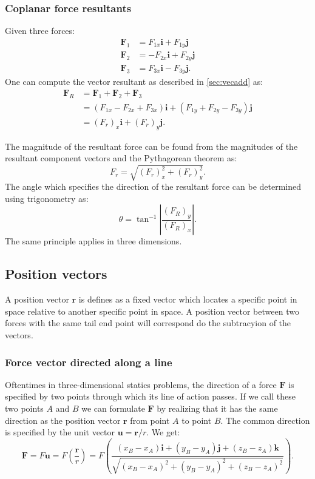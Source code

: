 \subsubsection{Coplanar force resultants}
Given three forces:
\begin{align*}
  \textbf{F}_1 &= F_{1x} \textbf{i} + F_{1y} \textbf{j} \\
  \textbf{F}_2 &= - F_{2x} \textbf{i} + F_{2y} \textbf{j} \\
  \textbf{F}_3 &= F_{3x} \textbf{i} - F_{3y} \textbf{j}
.\end{align*}
One can compute the vector resultant as described in \autoref{sec:vecadd} as:
\begin{align*}
  \textbf{F}_R &= \textbf{F}_1 + \textbf{F}_2 + \textbf{F}_3 \\
  &= \left( F_{1x} - F_{2x} + F_{3x} \right) \textbf{i} + \left( F_{1y} + F_{2y} - F_{3y} \right) \textbf{j} \\
  &= \left( F_r \right)_x \textbf{i} + \left( F_{r} \right)_y \textbf{j}
.\end{align*}

The magnitude of the resultant force can be found from the magnitudes of the resultant component vectors and the Pythagorean theorem as:
\[ 
F_r = \sqrt{\left( F_r \right)^2_{x} + \left( F_{r} \right)^2_y}
.\]
The angle which specifies the direction of the resultant force can be determined using trigonometry as:
\[ 
\theta = \tan^{-1} \left| \frac{\left( F_R \right)_y}{\left( F_R \right)_x} \right|
.\]
The same principle applies in three dimensions.


\subsection{Position vectors}
A position vector $\textbf{r}$ is defines as a fixed vector which locates a specific point in space relative to another specific point in space. A position vector between two forces with the same tail end point will correspond do the subtracyion of the vectors. 


\subsubsection{Force vector directed along a line}
Oftentimes in three-dimensional statics problems, the direction of a force $\textbf{F}$ is specified by two points through which its line of action passes. If we call these two points $A$ and $B$ we can formulate $\textbf{F}$ by realizing that it has the same direction as the position vector $\textbf{r}$ from point $A$ to point $B$. The common direction is specified by the unit vector $\textbf{u} = \textbf{r} / r$. We get:
\[ 
\textbf{F} = F \textbf{u} = F \left( \frac{\textbf{r}}{r} \right) = F \left( \frac{\left( x_{B} - x_A \right) \textbf{i} + \left( y_B - y_A \right) \textbf{j} + \left( z_{B} - z_A \right) \textbf{k}}{\sqrt{\left( x_B -x_A \right)^2 + \left( y_B - y_A \right)^2 + \left( z_B - z_A \right)^2}} \right)
.\]

